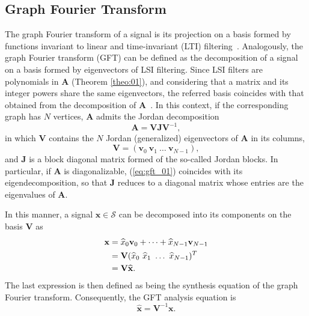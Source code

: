 \subsection{Graph Fourier Transform}

The graph Fourier transform of a signal is its projection on a basis formed by functions invariant to linear and time-invariant (LTI) filtering~\cite{oppenheim1997signals}. Analogously, the graph Fourier transform (GFT) can be defined as the decomposition of a signal on a basis formed by eigenvectors of LSI filtering. Since LSI filters are polynomials in $ \mathbf{A} $ (Theorem \ref{theo:01}), and considering that a matrix and its integer powers share the same eigenvectors, the referred basis coincides with that obtained from the decomposition of $\mathbf{A}$~\cite{sandryhaila2013gft}. In this context, if the corresponding graph has $ N $ vertices, $\mathbf{A} $ admits the Jordan decomposition
\begin{equation}\label{eq:gft_01}
\mathbf{A} = \mathbf{V} \mathbf{J} \mathbf{V}^{-1},
\end{equation}
in which $ \mathbf{V} $ contains the $ N $ Jordan (generalized) eigenvectors of $ \mathbf{A} $ in its columns,
\begin{equation}\label{eq:gft_02}
\mathbf{V} = \left(\mathbf{v}_0 \ \mathbf{v}_1 \ \dots\ \mathbf{v}_{N-1}\right),
\end{equation}
and $\mathbf{J}$ is a block diagonal matrix formed of the so-called Jordan blocks. In particular, if $\mathbf{A}$ is diagonalizable, (\ref{eq:gft_01}) coincides with its eigendecomposition, so that $\mathbf{J}$ reduces to a diagonal matrix whose entries are the eigenvalues of $\mathbf{A}$.


In this manner, a signal $ \mathbf{x} \in \mathcal{S} $ can be decomposed into its components on the basis $ \mathbf{V} $ as
\begin{align}\label{eq:GFT_inv}
\mathbf{x} &= \widehat{x}_0 \mathbf{v}_0 + \dots + \widehat{x}_{N-1} \mathbf{v}_{N-1} \notag \\
&= \mathbf{V} (\widehat{x}_0 \ \widehat{x}_1 \ \dots \ \widehat{x}_{N-1})^T \notag \\
&= \mathbf{V} \widehat{\mathbf{x}}.
\end{align}
The last expression is then defined as being the synthesis equation of the graph Fourier transform. Consequently, the GFT analysis equation is
\begin{equation}\label{eq:GFT_fwd}
\widehat{\mathbf{x}} = \mathbf{V}^{-1} \mathbf{x}.
\end{equation}

